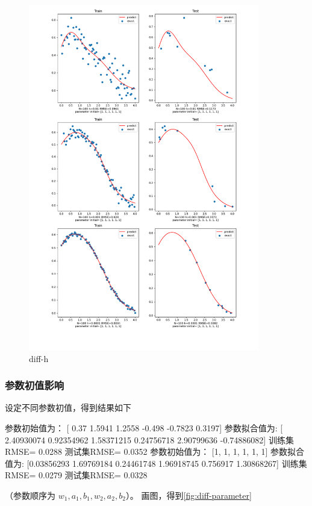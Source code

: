 \begin{figure}[H]
    \begin{center}
        \includegraphics[width=0.9\textwidth]{img/1-diff-h.png}
    \end{center}
   \caption[]{diff-h}
    \label{fig:diff-h}
\end{figure} 

\subsubsection{参数初值影响}
    设定不同参数初值，得到结果如下
    \begin{python}
        参数初始值为： [ 0.37    1.5941  1.2558 -0.498  -0.7823  0.3197]
参数拟合值为: [ 2.40930074  0.92354962  1.58371215  0.24756718  2.90799636 -0.74886082]
训练集RMSE= 0.0288
测试集RMSE= 0.0352
参数初始值为： [1, 1, 1, 1, 1, 1]
参数拟合值为: [0.03856293 1.69769184 0.24461748 1.96918745 0.756917   1.30868267]
训练集RMSE= 0.0279
测试集RMSE= 0.0328
    \end{python}
    （参数顺序为 $w_1, a_1,b_1,w_2,a_2,b_2$）。
    画图，得到\ref{fig:diff-parameter}

